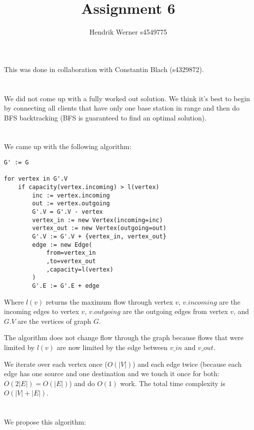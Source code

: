 \documentclass[12pt]{article}
\title {Assignment 6}
\author {Hendrik Werner s4549775}
\begin{document}
\maketitle

This was done in collaboration with Constantin Blach (s4329872).

\section{} %
We did not come up with a fully worked out solution. We think it's best to begin by connecting all clients that have only one base station in range and then do BFS backtracking (BFS is guaranteed to find an optimal solution).

\section{} %
We came up with the following algorithm:

\begin{lstlisting}
G' := G

for vertex in G'.V
	if capacity(vertex.incoming) > l(vertex)
		inc := vertex.incoming
		out := vertex.outgoing
		G'.V = G'.V - vertex
		vertex_in := new Vertex(incoming=inc)
		vertex_out := new Vertex(outgoing=out)
		G'.V := G'.V + {vertex_in, vertex_out}
		edge := new Edge(
			from=vertex_in
			,to=vertex_out
			,capacity=l(vertex)
		)
		G'.E := G'.E + edge
\end{lstlisting}

Where $l(v)$ returns the maximum flow through vertex $v$, $v.incoming$ are the incoming edges to vertex $v$, $v.outgoing$ are the outgoing edges from vertex $v$, and $G.V$ are the vertices of graph $G$.

The algorithm does not change flow through the graph because flows that were limited by $l(v)$ are now limited by the edge between $v\_in$ and $v\_out$.

We iterate over each vertex once ($O(|V|)$) and each edge twice (because each edge has one source and one destination and we touch it once for both: $O(2|E|) = O(|E|)$) and do $O(1)$ work. The total time complexity is $O(|V| + |E|)$.

\section{} %
We propose this algorithm:
\end{document}
